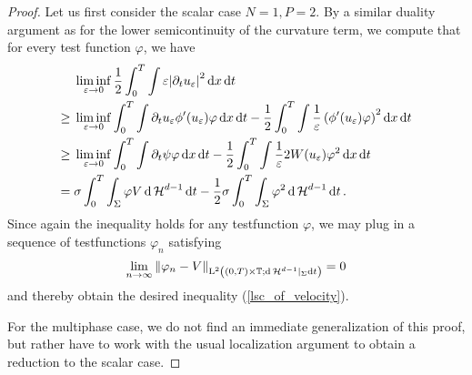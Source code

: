 \begin{proof}
	Let us first consider the 
	scalar case $ N = 1 , P = 2 $. By a similar duality argument as for the 
	lower semicontinuity of the curvature term, we compute 
	that for 
	every test function $ \varphi $, we have
	\begin{align*}
		& \liminf_{ \varepsilon \to 0 }
			\frac{ 1 }{ 2 }
			\int_{ 0 }^{ T }
				\int
					\varepsilon \abs{ \partial_{ t } u_{ \varepsilon } }^{ 2 }
				\dd{ x }
			\dd{ t }
		\\
		\geq{} &
		\liminf_{ \varepsilon \to 0 }
			\int_{ 0 }^{ T }
				\int
					\partial_{ t } u_{ \varepsilon } 
					\phi ' ( u_{ \varepsilon } )
					\varphi
				\dd{ x }
			\dd{ t }
		-
		\frac{ 1 }{ 2 }
		\int_{ 0 }^{ T }
			\int
				\frac{ 1 }{ \varepsilon }
				\left( \phi ' ( u_{ \varepsilon } ) \varphi \right)^{ 2 }
			\dd{ x }
		\dd{ t }
		\\
		\geq{} &
		\liminf_{ \varepsilon \to 0 }
			\int_{ 0 }^{ T }
				\int
					\partial_{ t } \psi
					\varphi
				\dd{ x }
			\dd{ t }
			-
			\frac{ 1 }{ 2 }
			\int_{ 0 }^{ T }
				\int
					\frac{ 1 }{ \varepsilon }
					2 W ( u_{ \varepsilon } )
					\varphi^{ 2 }
				\dd{ x }
			\dd{ t }
		\\
		={} &
		\sigma
		\int_{ 0 }^{ T }
			\int_{ \Sigma }
				\varphi V
			\dd{ \operatorname{\mathcal{H}}^{ d - 1 } }
		\dd{ t }
		-
		\frac{ 1 }{ 2 }
		\sigma
		\int_{ 0 }^{ T }
			\int_{ \Sigma }
				\varphi^{ 2 }
			\dd{ \operatorname{\mathcal{H}}^{ d - 1 } }
		\dd{ t }.
	\end{align*}	
	Since again the inequality holds for any testfunction $ \varphi $, we may 
	plug in a sequence of testfunctions $ \varphi_{ n } $ satisfying
	\begin{equation*}
		\lim_{ n \to \infty }
			\norm{ \varphi_{ n } - V }_{ \operatorname{L}^{ 2 } \left( ( 0 , T ) \times 
			\operatorname{\mathbb{T}} ; \dd{ \operatorname{\mathcal{H}}^{ d - 1 } } |_{ \Sigma } \dd{ t } \right) }
		= 0
	\end{equation*}
	and thereby obtain the desired inequality (\ref{lsc_of_velocity}).
	
	For the multiphase case, we do not find an immediate generalization of this 
	proof, but rather have to work with the usual localization argument to 
	obtain a reduction to the scalar case.
	

\end{proof}
